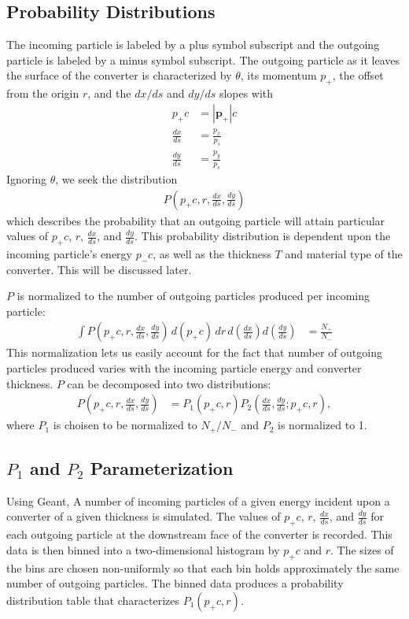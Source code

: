 \documentclass[12pt]{article}
\newcommand{\dxds}{\frac{dx}{ds}}
\newcommand{\dyds}{\frac{dy}{ds}}
\begin{document}
\subsection{Probability Distributions}

The incoming particle is labeled by a plus symbol subscript and the outgoing particle is labeled by
a minus symbol subscript. The outgoing particle as it leaves the surface of the converter is
characterized by $\theta$, its momentum $p_+$, the offset from the origin $r$, and the $dx/ds$ and
$dy/ds$ slopes with
\begin{align}
p_+ c & = \left| \mathbf{p}_+ \right| c \\
\dxds & = \frac{p_x}{p_s} \\
\dyds & = \frac{p_y}{p_s}
\end{align}
Ignoring $\theta$, we seek the distribution
\begin{align}
P \left( p_+ c, r, \dxds, \dyds \right)
\end{align}
which describes the probability that an outgoing particle will attain particular values of $p_+ c$,
$r$, $\dxds$, and $\dyds$. This probability distribution is dependent upon the incoming particle's
energy $p_- c$, as well as the thickness $T$ and material type of the converter. This will be discussed later.

$P$ is normalized to the number of outgoing particles produced per incoming particle:
\begin{align}
\int P \left( p_+ c, r, \dxds, \dyds \right) \, d(p_+ c) \, dr \, d \! \left( \dxds \right) d \! \left( \dyds \right) & = \frac{N_+}{N_-}
\end{align}
This normalization lets us easily account for the fact that number of outgoing particles produced
varies with the incoming particle energy and converter thickness. $P$ can be decomposed into two distributions:
\begin{align}
P \left( p_+ c, r, \dxds, \dyds \right) & = P_1 \left( p_+ c, r \right) P_2 \left( \dxds, \dyds ; p_+ c , r \right),
\end{align}
where $P_1$ is choisen to be normalized to $N_+/N_-$ and $P_2$ is normalized to 1.

\subsection{$P_1$ and $P_2$ Parameterization}

Using Geant\cite{geant}, A number of incoming particles of a given energy incident upon a converter
of a given thickness is simulated.  The values of $p_+ c$, $r$, $\dxds$, and $\dyds$ for each
outgoing particle at the downstream face of the converter is recorded. This data is then binned into
a two-dimensional histogram by $p_+ c$ and $r$. The sizes of the bins are chosen non-uniformly so
that each bin holds approximately the same number of outgoing particles. The binned data produces a
probability distribution table that characterizes $P_1(p_+c, r)$.
\end{document}
